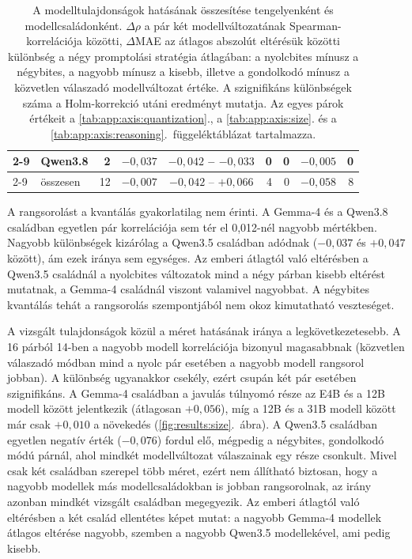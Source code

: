 \documentclass[
]{elteikthesis}[2024/04/26]
\begin{document}
\begin{table}[htbp]
{\begin{tabular}{ | l | l | r | r | c | r | r | r | r | }
		\cline{2-9}
		 & Qwen3.8 & 2 & $-0{,}037$ & $-0{,}042$ -- $-0{,}033$ & 0 & 0 & $-0{,}005$ & 0 \\
		\cline{2-9}
		 & összesen & 12 & $-0{,}007$ & $-0{,}042$ -- $+0{,}066$ & 4 & 0 & $-0{,}058$ & 8 \\
		\hline
	\end{tabular}}
	\caption[A modelltulajdonságok hatásának összesítése]{A modelltulajdonságok hatásának összesítése
	tengelyenként és modellcsaládonként.
	$\Delta\rho$ a pár két modellváltozatának Spearman-korrelációja közötti,
	$\Delta$MAE az átlagos abszolút eltérésük közötti különbség a négy promptolási stratégia átlagában:
	a nyolcbites mínusz a négybites,
	a nagyobb mínusz a kisebb,
	illetve a gondolkodó mínusz a közvetlen válaszadó modellváltozat értéke.
	A szignifikáns különbségek száma a Holm-korrekció utáni eredményt mutatja.
	Az egyes párok értékeit a \ref{tab:app:axis:quantization}., a
	\ref{tab:app:axis:size}. és a \ref{tab:app:axis:reasoning}.~függeléktáblázat tartalmazza.}
	\label{tab:discussion:axes}
\end{table}

A rangsorolást a kvantálás gyakorlatilag nem érinti.
A Gemma-4 és a Qwen3.8 családban egyetlen pár korrelációja sem tér el 0,012-nél nagyobb mértékben.
Nagyobb különbségek kizárólag a Qwen3.5 családban adódnak ($-0{,}037$ és $+0{,}047$ között), ám ezek iránya sem egységes.
Az emberi átlagtól való eltérésben
a Qwen3.5 családnál a nyolcbites változatok mind a négy párban kisebb eltérést mutatnak,
a Gemma-4 családnál viszont valamivel nagyobbat.
A négybites kvantálás tehát a rangsorolás szempontjából nem okoz kimutatható veszteséget.

A vizsgált tulajdonságok közül a méret hatásának iránya a legkövetkezetesebb.
A 16 párból 14-ben a nagyobb modell korrelációja bizonyul magasabbnak
(közvetlen válaszadó módban mind a nyolc pár esetében a nagyobb modell rangsorol jobban).
A különbség ugyanakkor csekély, ezért csupán két pár esetében szignifikáns.
A Gemma-4 családban a javulás túlnyomó része az E4B és a 12B modell között jelentkezik (átlagosan $+0{,}056$),
míg a 12B és a 31B modell között már csak $+0{,}010$ a növekedés (\ref{fig:results:size}.~ábra).
A Qwen3.5 családban egyetlen negatív érték ($-0{,}076$) fordul elő,
mégpedig a négybites, gondolkodó módú párnál,
ahol mindkét modellváltozat válaszainak egy része csonkult.
Mivel csak két családban szerepel több méret, ezért nem állítható biztosan,
hogy a nagyobb modellek más modellcsaládokban is jobban rangsorolnak,
az irány azonban mindkét vizsgált családban megegyezik.
Az emberi átlagtól való eltérésben a két család ellentétes képet mutat:
a nagyobb Gemma-4 modellek átlagos eltérése nagyobb, szemben a nagyobb Qwen3.5 modellekével, ami pedig kisebb.
\end{document}
